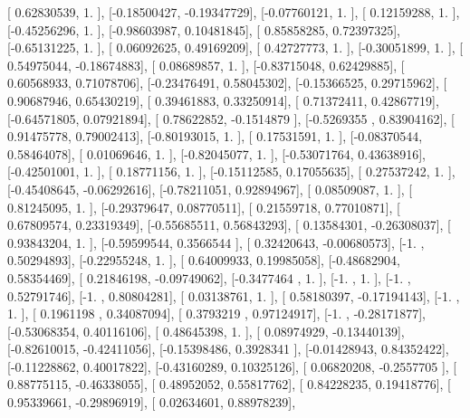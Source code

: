 \documentclass{article}
\begin{document}
       [ 0.62830539,  1.        ],
       [-0.18500427, -0.19347729],
       [-0.07760121,  1.        ],
       [ 0.12159288,  1.        ],
       [-0.45256296,  1.        ],
       [-0.98603987,  0.10481845],
       [ 0.85858285,  0.72397325],
       [-0.65131225,  1.        ],
       [ 0.06092625,  0.49169209],
       [ 0.42727773,  1.        ],
       [-0.30051899,  1.        ],
       [ 0.54975044, -0.18674883],
       [ 0.08689857,  1.        ],
       [-0.83715048,  0.62429885],
       [ 0.60568933,  0.71078706],
       [-0.23476491,  0.58045302],
       [-0.15366525,  0.29715962],
       [ 0.90687946,  0.65430219],
       [ 0.39461883,  0.33250914],
       [ 0.71372411,  0.42867719],
       [-0.64571805,  0.07921894],
       [ 0.78622852, -0.1514879 ],
       [-0.5269355 ,  0.83904162],
       [ 0.91475778,  0.79002413],
       [-0.80193015,  1.        ],
       [ 0.17531591,  1.        ],
       [-0.08370544,  0.58464078],
       [ 0.01069646,  1.        ],
       [-0.82045077,  1.        ],
       [-0.53071764,  0.43638916],
       [-0.42501001,  1.        ],
       [ 0.18771156,  1.        ],
       [-0.15112585,  0.17055635],
       [ 0.27537242,  1.        ],
       [-0.45408645, -0.06292616],
       [-0.78211051,  0.92894967],
       [ 0.08509087,  1.        ],
       [ 0.81245095,  1.        ],
       [-0.29379647,  0.08770511],
       [ 0.21559718,  0.77010871],
       [ 0.67809574,  0.23319349],
       [-0.55685511,  0.56843293],
       [ 0.13584301, -0.26308037],
       [ 0.93843204,  1.        ],
       [-0.59599544,  0.3566544 ],
       [ 0.32420643, -0.00680573],
       [-1.        ,  0.50294893],
       [-0.22955248,  1.        ],
       [ 0.64009933,  0.19985058],
       [-0.48682904,  0.58354469],
       [ 0.21846198, -0.09749062],
       [-0.3477464 ,  1.        ],
       [-1.        ,  1.        ],
       [-1.        ,  0.52791746],
       [-1.        ,  0.80804281],
       [ 0.03138761,  1.        ],
       [ 0.58180397, -0.17194143],
       [-1.        ,  1.        ],
       [ 0.1961198 ,  0.34087094],
       [ 0.3793219 ,  0.97124917],
       [-1.        , -0.28171877],
       [-0.53068354,  0.40116106],
       [ 0.48645398,  1.        ],
       [ 0.08974929, -0.13440139],
       [-0.82610015, -0.42411056],
       [-0.15398486,  0.3928341 ],
       [-0.01428943,  0.84352422],
       [-0.11228862,  0.40017822],
       [-0.43160289,  0.10325126],
       [ 0.06820208, -0.2557705 ],
       [ 0.88775115, -0.46338055],
       [ 0.48952052,  0.55817762],
       [ 0.84228235,  0.19418776],
       [ 0.95339661, -0.29896919],
       [ 0.02634601,  0.88978239],
\end{document}
